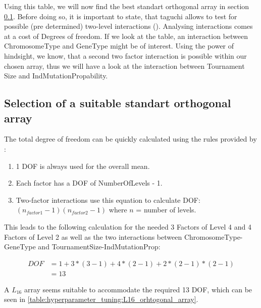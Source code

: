 Using this table, we will now find the best standart orthogonal array in section \ref{chap:hyperparameter_tuning:selection_orthogonal_array}. Before doing so, it is important to state, that taguchi allows to test for possible (pre determined) two-level interactions (\cite{yang_design_2009}). Analysing interactions comes at a cost of Degrees of freedom. If we look at the table, an interaction between ChromosomeType and GeneType might be of interest. Using the power of hindsight, we know, that a second two factor interaction is possible within our chosen array, thus we will have a look at the interaction between Tournament Size and IndMutationPropability.


\subsection{Selection of a suitable standart orthogonal array}
\label{chap:hyperparameter_tuning:selection_orthogonal_array}
The total degree of freedom can be quickly calculated using the rules provided by \cite{yang_design_2009}:

\begin{enumerate}
	\item 1 DOF is always used for the overall mean. 
	\item Each factor has a DOF of NumberOfLevels - 1.
	\item Two-factor interactions use this equation to calculate DOF: $(n_{factor1} - 1)(n_{factor2} - 1)$ where $n$ = number of levels.
\end{enumerate}


This leads to the following calculation for the needed 3 Factors of Level 4 and 4 Factors of Level 2 as well as the two interactions between ChromosomeType-GeneType and TournamentSize-IndMutationProp:

\begin{equation} \label{DOF}
	\begin{split}
		DOF & = 1 + 3 * (3 - 1) + 4 * (2 - 1) + 2 * (2 - 1) * (2 - 1) \\
		& = 13
	\end{split}
\end{equation}

A $L_{16}$ array seems suitable to accommodate the required 13 DOF, which can be seen in \ref{table:hyperparameter_tuning:L16_orhtogonal_array}.


